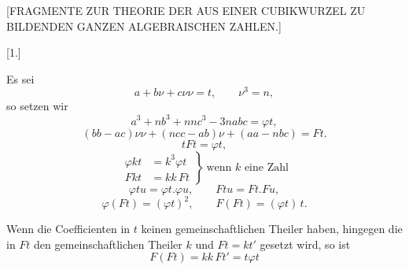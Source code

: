 \clearpage
{}
\begin{center}\large [FRAGMENTE ZUR THEORIE DER AUS EINER CUBIKWURZEL ZU BILDENDEN GANZEN ALGEBRAISCHEN ZAHLEN.]\end{center}

\begin{center}[1.]\end{center}\par\noindent\hspace*{\parindent}Es sei
\[
a+b\nu+c\nu\nu = t, \qquad \nu^3 = n,
\]
\noindent so setzen wir
\[
a^3+nb^3+nnc^3-3nabc = \varphi t,
\]
\[
(bb-ac)\nu\nu+(ncc-ab)\nu+(aa-nbc) = Ft.
\]
\noindent{}
\[
tFt = \varphi t,
\]
\[
\left.\begin{aligned}
\varphi kt &= k^3 \varphi t \\
Fkt &= kk\,Ft
\end{aligned}\right\}\ \text{wenn } k \text{ eine Zahl}
\]
\[
\varphi tu = \varphi t . \varphi u, \qquad Ftu = Ft . Fu,
\]
\[
\varphi(Ft) = (\varphi t)^2, \qquad F(Ft) = (\varphi t)\,t.
\]

Wenn die Coefficienten in $t$ keinen gemeinschaftlichen Theiler haben, hingegen die in $Ft$ den
gemeinschaftlichen Theiler $k$ und $Ft = kt'$ gesetzt wird, so ist
\[
F(Ft) = kk\,Ft' = t\varphi t
\]%
